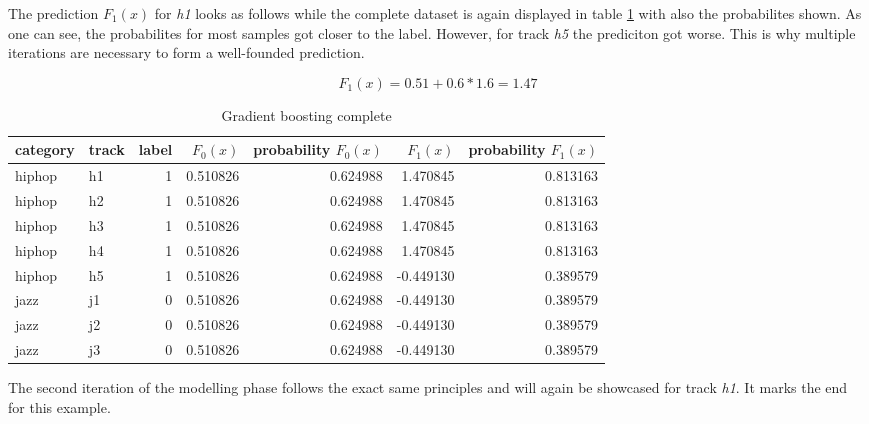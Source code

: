 The prediction \(F_{1}(x)\) for \emph{h1} looks as follows while the complete dataset is again displayed in table \ref{tbl:theory_output_values_1_iteration} with also 
the probabilites shown. As one can see, the probabilites for most samples got closer to the label. However, for track
\emph{h5} the prediciton got worse. This is why multiple iterations are necessary to form a well-founded prediction.

\begin{equation*}
F_{1}(x) = 0.51 + 0.6 * 1.6 = 1.47
\end{equation*}


\begin{table}[H]
    \centering
    \begin{tabular}{llrrrrr}
        \toprule
        category & track &  label & \(F_{0}(x)\) &  probability \(F_{0}(x)\) &  \(F_{1}(x)\) &  probability \(F_{1}(x)\) \\
        \midrule
          hiphop &    h1 &      1 & 0.510826 &         0.624988 &  1.470845 &         0.813163 \\
          hiphop &    h2 &      1 & 0.510826 &         0.624988 &  1.470845 &         0.813163 \\
          hiphop &    h3 &      1 & 0.510826 &         0.624988 &  1.470845 &         0.813163 \\
          hiphop &    h4 &      1 & 0.510826 &         0.624988 &  1.470845 &         0.813163 \\
          hiphop &    h5 &      1 & 0.510826 &         0.624988 & -0.449130 &         0.389579 \\
            jazz &    j1 &      0 & 0.510826 &         0.624988 & -0.449130 &         0.389579 \\
            jazz &    j2 &      0 & 0.510826 &         0.624988 & -0.449130 &         0.389579 \\
            jazz &    j3 &      0 & 0.510826 &         0.624988 & -0.449130 &         0.389579 \\
        \bottomrule
        \end{tabular}
    \caption{Gradient boosting complete}%
    \label{tbl:theory_output_values_1_iteration}%
  \end{table} 

The second iteration of the modelling phase follows the exact same principles and will again be showcased for track \emph{h1}. 
It marks the end for this example. 

